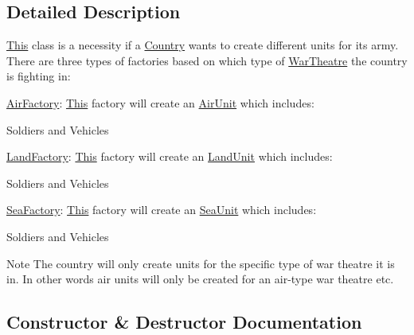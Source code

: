 \subsection{Detailed Description}
\mbox{\hyperlink{class_this}{This}} class is a necessity if a \mbox{\hyperlink{class_country}{Country}} wants to create different units for its army. There are three types of factories based on which type of \mbox{\hyperlink{class_war_theatre}{War\+Theatre}} the country is fighting in\+:
\begin{DoxyItemize}
\item \mbox{\hyperlink{class_air_factory}{Air\+Factory}}\+: \mbox{\hyperlink{class_this}{This}} factory will create an \mbox{\hyperlink{class_air_unit}{Air\+Unit}} which includes\+:
\begin{DoxyItemize}
\item Soldiers and Vehicles
\end{DoxyItemize}
\item \mbox{\hyperlink{class_land_factory}{Land\+Factory}}\+: \mbox{\hyperlink{class_this}{This}} factory will create an \mbox{\hyperlink{class_land_unit}{Land\+Unit}} which includes\+:
\begin{DoxyItemize}
\item Soldiers and Vehicles
\end{DoxyItemize}
\item \mbox{\hyperlink{class_sea_factory}{Sea\+Factory}}\+: \mbox{\hyperlink{class_this}{This}} factory will create an \mbox{\hyperlink{class_sea_unit}{Sea\+Unit}} which includes\+:
\begin{DoxyItemize}
\item Soldiers and Vehicles
\end{DoxyItemize}
\end{DoxyItemize}

\begin{DoxyNote}{Note}
The country will only create units for the specific type of war theatre it is in. In other words air units will only be created for an air-\/type war theatre etc. 
\end{DoxyNote}


\subsection{Constructor \& Destructor Documentation}
\mbox{\label{class_unit_factory_a7ea35d172bba07f7242b9ee1a5dd2c85}} 
